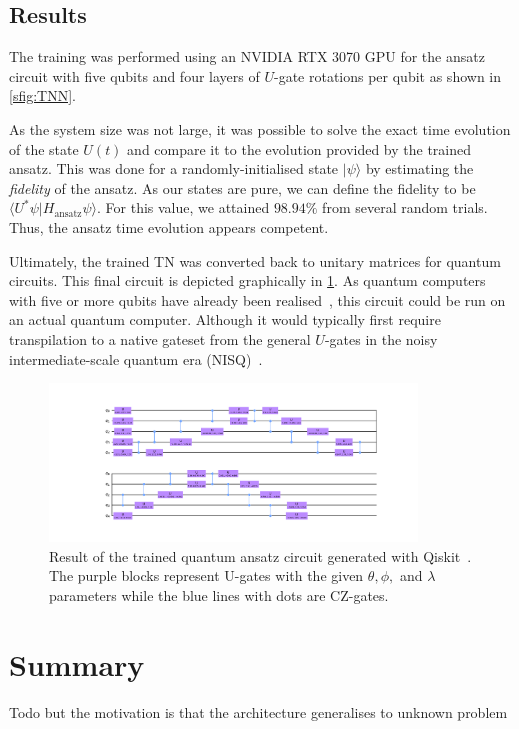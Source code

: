 \subsection{Results}

The training was performed using an NVIDIA RTX 3070 GPU for the ansatz circuit with five qubits and four layers of $U$-gate rotations per qubit as shown in \cref{sfig:TNN}.

As the system size was not large, it was possible to solve the exact time evolution of the state $U(t)$ and compare it to the evolution provided by the trained ansatz. This was done for a randomly-initialised state $|\psi\rangle$ by estimating the \emph{fidelity} of the ansatz. As our states are pure, we can define the fidelity to be $\langle U^* \psi | H_\text{ansatz} \psi \rangle$. For this value, we attained $98.94 \%$ from several random trials. Thus, the ansatz time evolution appears competent.

Ultimately, the trained TN was converted back to unitary matrices for quantum circuits. This final circuit is depicted graphically in \cref{fig:qasm_circuit}. As quantum computers with five or more qubits have already been realised~\cite{VTT-IQM}, this circuit could be run on an actual quantum computer. Although it would typically first require transpilation to a native gateset from the general $U$-gates in the noisy intermediate-scale quantum era (NISQ)~\cite{Wilson2020,Li2020}.

\begin{figure}[htb]
    \centering
    \includegraphics[width=0.87\textwidth]{figures/ansatz_circuit.pdf}
    \caption{Result of the trained quantum ansatz circuit generated with Qiskit~\cite{Qiskit}. The purple blocks represent U-gates with the given $\theta, \phi,$ and $\lambda$ parameters while the blue lines with dots are CZ-gates.}
    \label{fig:qasm_circuit}
\end{figure}



\section{Summary}

Todo
but the motivation is that the architecture generalises to unknown problem






\newpage
\pagestyle{plain}
\setlength{}
\renewcommand*{\bibfont}{\footnotesize}
\printbibliography{}



